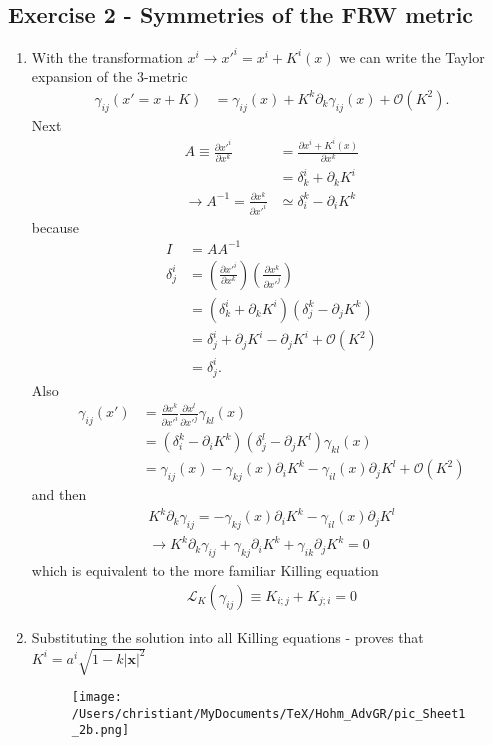 \documentclass[10pt,a4paper]{article}
\theoremstyle{definition}
\begin{document}
\subsection{Exercise 2 - Symmetries of the FRW metric}
\begin{enumerate}[1.]
\item With the transformation $x^i\rightarrow x'^i=x^i+K^i(x)$ we can write the Taylor expansion of the 3-metric
\begin{align}
\gamma_{ij}(x'=x+K)
&=\gamma_{ij}(x)+K^k\partial_k\gamma_{ij}(x)+\mathcal{O}(K^2).
\end{align}
Next
\begin{align}
A\equiv\frac{\partial x'^i}{\partial x^k}
&=\frac{\partial x^i+K^i(x)}{\partial x^k}\\
&=\delta^i_k+\partial_kK^i\\
\rightarrow 
A^{-1}=\frac{\partial x^k}{\partial x'^i}
&\simeq\delta^k_i-\partial_iK^k
\end{align}
because
\begin{align}
I&=A A^{-1}\\
\delta^i_j
&=\left(\frac{\partial x'^i}{\partial x^k}\right)\left(\frac{\partial x^k}{\partial x'^j}\right)\\
&=(\delta^i_k+\partial_kK^i)(\delta^k_j-\partial_jK^k)\\
&=\delta^i_j+\partial_jK^i-\partial_jK^i+\mathcal{O}(K^2)\\
&=\delta^i_j.
\end{align}
Also
\begin{align}
\gamma_{ij}(x')
&=\frac{\partial x^k}{\partial x'^i}
\frac{\partial x^l}{\partial x'^j}\gamma_{kl}(x)\\
&=\left(\delta^k_i-\partial_iK^k\right)
\left(\delta^l_j-\partial_jK^l\right)
\gamma_{kl}(x)\\
&=\gamma_{ij}(x)
-\gamma_{kj}(x)\partial_iK^k
-\gamma_{il}(x)\partial_jK^l
+\mathcal{O}(K^2)
\end{align}
and then
\begin{align}
K^k\partial_k\gamma_{ij}=-\gamma_{kj}(x)\partial_iK^k
-\gamma_{il}(x)\partial_jK^l\\
\rightarrow K^k\partial_k\gamma_{ij}+\gamma_{kj}\partial_iK^k
+\gamma_{ik}\partial_jK^k=0
\end{align}
which is equivalent to the more familiar Killing equation
\begin{align}
\mathcal{L}_K(\gamma_{ij})\equiv K_{i;j}+K_{j;i}=0
\end{align}
\item Substituting the solution into all Killing equations - proves that $K^i=a^i\sqrt{1-k|\mathbf{x}|^2}$ 
\begin{figure}[!h]
\centering
\texttt{[image: /Users/christiant/MyDocuments/TeX/Hohm\_AdvGR/pic\_Sheet1\_2b.png]}
\end{figure}
\end{enumerate}
\end{document}
